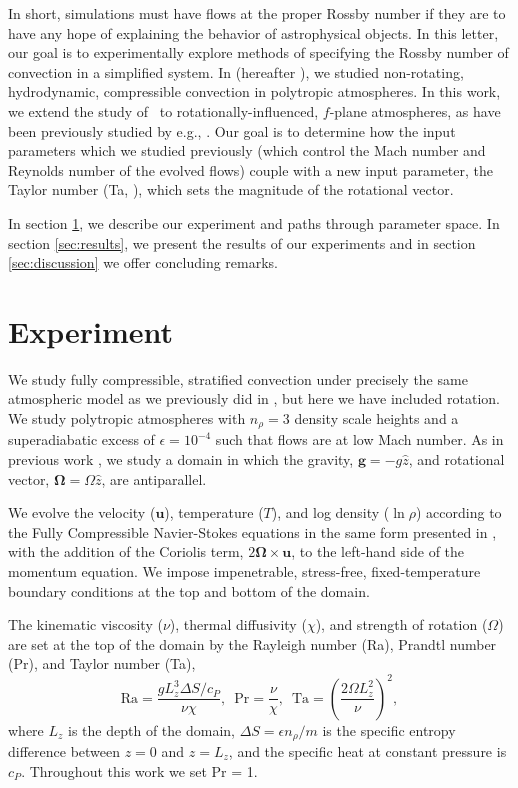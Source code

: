 \documentclass[twocolumn, amsmath, amsfonts, amssymb]{aastex62}
\begin{document}
In short, simulations must have flows
at the proper Rossby number if they are to have any hope of explaining the behavior of
astrophysical objects.
In this letter, our goal is to experimentally explore methods of specifying the Rossby number
of convection in a simplified system.
In \cite{anders&brown2017} (hereafter \AB), we studied non-rotating, hydrodynamic, 
compressible convection in polytropic atmospheres. 
In this work, we extend the study of \AB$\,$ to rotationally-influenced, $f$-plane
atmospheres, as have been previously studied by e.g.,
\cite{brummell&all1996, brummell&all1998, calkins&all2015a}. Our goal is to determine
how the input parameters which we studied previously (which control the Mach number and
Reynolds number of the evolved flows) couple with a new input
parameter, the Taylor number (Ta, \cite{julien&all1996}), which sets the magnitude of the
rotational vector. 

In section  \ref{sec:experiment}, we describe our experiment and paths through parameter space. 
In section \ref{sec:results}, we present
the results of our experiments and in section \ref{sec:discussion} we offer concluding remarks.

\section{Experiment} 
\label{sec:experiment}
We study fully compressible, stratified 
convection under precisely the same atmospheric model
as we previously did in \AB, but here
we have included rotation. We study polytropic atmospheres
with $n_\rho = 3$ density scale heights and a superadiabatic
excess of $\epsilon = 10^{-4}$ such that flows are at low Mach number.
As in previous work \citep{julien&all1996, brummell&all1996}, 
we study a domain in which the
gravity, $\bm{g} = -g\hat{z}$, and rotational vector, $\bm{\Omega} = \Omega \hat{z}$, 
are antiparallel.

We evolve the velocity ($\bm{u}$), temperature ($T$), 
and log density ($\ln\rho$) according to the
Fully Compressible Navier-Stokes equations in the same form presented in \AB, with the
addition of the Coriolis term, $2\bm{\Omega}\times\bm{u}$, to the left-hand side
of the momentum equation. We impose impenetrable, stress-free, fixed-temperature boundary
conditions at the top and bottom of the domain.


The kinematic viscosity ($\nu$), thermal diffusivity ($\chi$), and strength of
rotation ($\Omega$) are set at the top of the domain by the Rayleigh number
(Ra), Prandtl number (Pr), and Taylor number (Ta),
\begin{equation}
\text{Ra} = \frac{g L_z^3 \Delta S / c_P}{\nu \chi}, \,\,\,
\text{Pr} = \frac{\nu}{\chi}, \,\,\,
\text{Ta} = \left(\frac{2 \Omega L_z^2}{\nu}\right)^2,
\end{equation}
where $L_z$ is the depth of the domain, 
$\Delta S = \epsilon n_\rho / m$ is the specific entropy difference between
$z = 0$ and $z = L_z$, and the specific heat at constant pressure is $c_P$.
Throughout this work we set Pr = 1.
\end{document}
